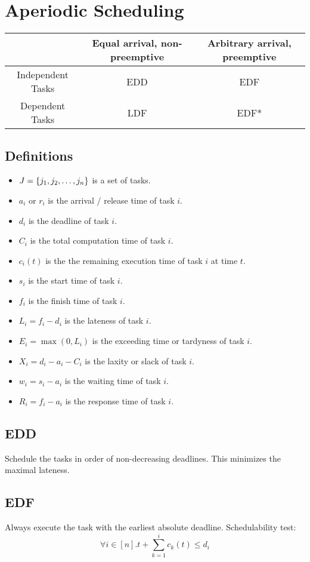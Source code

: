 \section{Aperiodic Scheduling}
\begin{center}
	{\renewcommand{\arraystretch}{2}
	\begin{tabular}{|c|c|c|}
		\hline
							& Equal arrival, non-preemptive	& Arbitrary arrival, preemptive \tabularnewline\hline
		Independent Tasks	& EDD							& EDF							\tabularnewline\hline
		Dependent Tasks		& LDF							& EDF*							\tabularnewline\hline
	\end{tabular}}
\end{center}

\subsection{Definitions}
\begin{itemize}
	\item $J = \left\lbrace j_1, j_2, \dots, j_n \right\rbrace$ is a set of tasks.
	\item $a_i$ or $r_i$ is the arrival / release time of task $i$.
	\item $d_i$ is the deadline of task $i$.
	\item $C_i$ is the total computation time of task $i$.
	\item $c_i(t)$ is the the remaining execution time of task $i$ at time $t$.
	\item $s_i$ is the start time of task $i$.
	\item $f_i$ is the finish time of task $i$.
	\item $L_i = f_i - d_i$ is the lateness of task $i$.
	\item $E_i = \max\left(0, L_i\right)$ is the exceeding time or tardyness of task $i$.
	\item $X_i = d_i - a_i - C_i$ is the laxity or slack of task $i$.
	\item $w_i = s_i - a_i$ is the waiting time of task $i$.
	\item $R_i = f_i - a_i$ is the response time of task $i$.
\end{itemize}

\subsection{EDD}
Schedule the tasks in order of non-decreasing deadlines. This minimizes the
maximal lateness.

\subsection{EDF}
Always execute the task with the earliest absolute deadline.
Schedulability test:
\begin{equation*}
	\forall i \in [n] . t + \sum_{k = 1}^{i} c_k(t) \leq d_i
\end{equation*}

